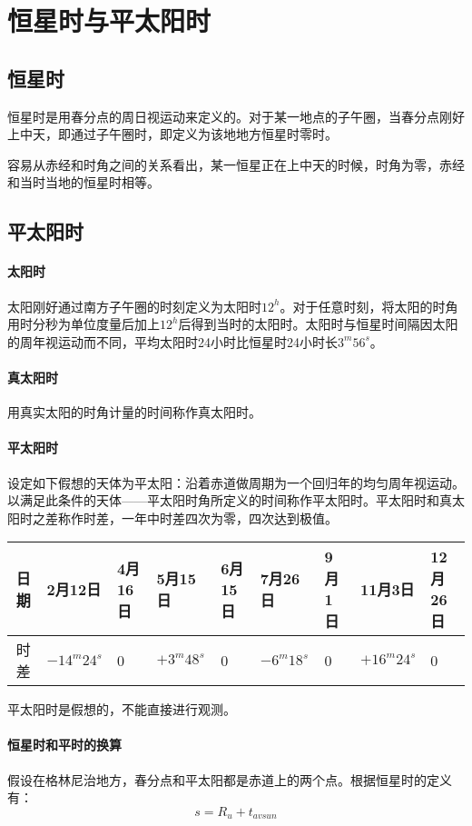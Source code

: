 \section{恒星时与平太阳时}
\subsection{恒星时}
恒星时是用春分点的周日视运动来定义的。对于某一地点的子午圈，当春分点刚好上中天，即通过子午圈时，即定义为该地地方恒星时零时。

容易从赤经和时角之间的关系看出，某一恒星正在上中天的时候，时角为零，赤经和当时当地的恒星时相等。

\subsection{平太阳时}
\paragraph{太阳时}
太阳刚好通过南方子午圈的时刻定义为太阳时$12^h$。对于任意时刻，将太阳的时角用时分秒为单位度量后加上$12^h$后得到当时的太阳时。太阳时与恒星时间隔因太阳的周年视运动而不同，平均太阳时24小时比恒星时24小时长$3^m56^s$。
\paragraph{真太阳时}
用真实太阳的时角计量的时间称作真太阳时。
\paragraph{平太阳时}
设定如下假想的天体为平太阳：沿着赤道做周期为一个回归年的均匀周年视运动。
以满足此条件的天体——平太阳时角所定义的时间称作平太阳时。平太阳时和真太阳时之差称作时差，一年中时差四次为零，四次达到极值。

\begin{center}
	\begin{tabularx}{\textwidth}{|c|X|X|X|X|X|X|X|X|}
		\hline
		日期 &2月12日&4月16日&5月15日&6月15日&7月26日&9月1日&11月3日&12月26日\\
		\hline 
		时差 &$-14^m24^s$&0&$+3^m48^s$&0&$-6^m18^s$&0&$+16^m24^s$&0\\
		\hline 
	\end{tabularx}
\end{center}
平太阳时是假想的，不能直接进行观测。
\paragraph{恒星时和平时的换算}
假设在格林尼治地方，春分点和平太阳都是赤道上的两个点。根据恒星时的定义有：
\begin{equation}
	s=R_{u}+t_{avsun}
\end{equation}

